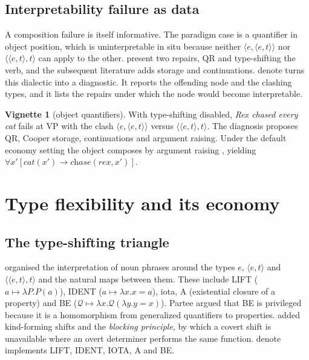 \documentclass[11pt,a4paper]{article}
\newcommand{\dn}{\textsf{denote}}
\newcommand{\ty}[1]{\langle #1\rangle}
\theoremstyle{definition}
\newtheorem{vignette}{Vignette}
\begin{document}
\subsection{Interpretability failure as data}
A composition failure is itself informative. The paradigm case is a quantifier in object position, which is uninterpretable in situ because neither $\ty{e,\ty{e,t}}$ nor $\ty{\ty{e,t},t}$ can apply to the other. \citet[ch.~7]{heimkratzer1998} present two repairs, QR and type-shifting the verb, and the subsequent literature adds storage and continuations. \dn{} turns this dialectic into a diagnostic. It reports the offending node and the clashing types, and it lists the repairs under which the node would become interpretable.

\begin{vignette}[object quantifiers]\label{v:object}
With type-shifting disabled, \textit{Rex chased every cat} fails at VP with the clash $\ty{e,\ty{e,t}}$ versus $\ty{\ty{e,t},t}$. The diagnosis proposes QR, Cooper storage, continuations and argument raising. Under the default economy setting the object composes by argument raising \citep{hendriks1993}, yielding $\forall x'[\textit{cat}(x')\to\textit{chase}(\textit{rex},x')]$.
\end{vignette}

\section{Type flexibility and its economy}\label{sec:flex}

\subsection{The type-shifting triangle}
\citet{partee1987} organised the interpretation of noun phrases around the types $e$, $\ty{e,t}$ and $\ty{\ty{e,t},t}$ and the natural maps between them. These include \textsf{LIFT} ($a\mapsto\lambda P.P(a)$), \textsf{IDENT} ($a\mapsto\lambda x.x=a$), \textsf{iota}, \textsf{A} (existential closure of a property) and \textsf{BE} ($\mathcal{Q}\mapsto\lambda x.\mathcal{Q}(\lambda y.y=x)$). Partee argued that \textsf{BE} is privileged because it is a homomorphism from generalized quantifiers to properties. \citet{chierchia1998} added kind-forming shifts and the \emph{blocking principle}, by which a covert shift is unavailable where an overt determiner performs the same function. \dn{} implements \textsf{LIFT}, \textsf{IDENT}, \textsf{IOTA}, \textsf{A} and \textsf{BE}.
\end{document}
